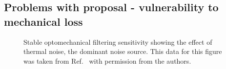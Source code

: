 


\subsection{Problems with proposal - vulnerability to mechanical loss}

\begin{figure}
	\centering
	\caption{Stable optomechanical filtering sensitivity showing the effect of thermal noise, the dominant noise source. This data for this figure was taken from Ref.~\cite{} with permission from the authors.}
	\label{fig:}
\end{figure}


